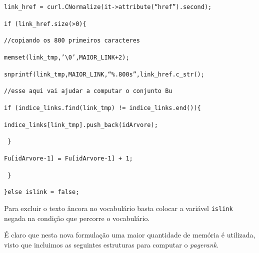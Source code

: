 \documentclass[a4paper]{article}
\begin{document}
\hspace{0.5cm}\texttt{link\_href = curl.CNormalize(it->attribute(``href'').second);}

\hspace{0.5cm}\texttt{if (link\_href.size(>0)\{}

\hspace{1.0cm}\texttt{//copiando os 800 primeiros caracteres}

\hspace{1.0cm}\texttt{memset(link\_tmp,'\textbackslash 0',MAIOR\_LINK+2);}

\hspace{1.0cm}\texttt{snprintf(link\_tmp,MAIOR\_LINK,``\%.800s'',link\_href.c\_str();}

\hspace{1.0cm}\texttt{//esse aqui vai ajudar a computar o conjunto Bu}

\hspace{1.0cm}\texttt{if (indice\_links.find(link\_tmp) != indice\_links.end())\{}

\hspace{1.5cm}\texttt{indice\_links[link\_tmp].push\_back(idArvore);}

\hspace{1.0cm}\texttt{ \}}

\hspace{1.0cm}\texttt{Fu[idArvore-1] =  Fu[idArvore-1] + 1;}

\hspace{0.5cm}\texttt{ \}}

\texttt{\}else islink = false;}

Para excluir o texto âncora no vocabulário basta colocar a variável 
\texttt{islink} negada na condição que percorre o vocabulário.

É claro que nesta nova formulação uma maior quantidade de memória é 
utilizada, visto que incluimos as seguintes estruturas para computar 
o \emph{pagerank}.
\end{document}
